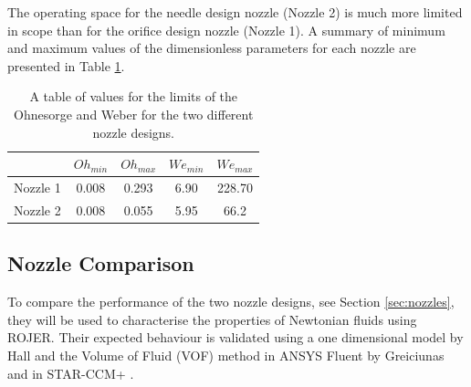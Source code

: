 \documentclass[11pt]{article}
\begin{document}
The operating space for the needle design nozzle (Nozzle 2) is much more limited in scope than for the orifice design nozzle (Nozzle 1). A summary of minimum and maximum values of the dimensionless parameters for each nozzle are presented in Table \ref{tbl:operability}. 
\begin{table}[h]
\centering
\begin{tabular}{c|c|c|c|c|}
\cline{2-5}
                               & $Oh_{min}$ & $Oh_{max}$ & $We_{min}$ & $We_{max}$ \\ \hline
\multicolumn{1}{|c|}{Nozzle 1} & 0.008      & 0.293      & 6.90       & 228.70     \\ \hline
\multicolumn{1}{|c|}{Nozzle 2} & 0.008      & 0.055      & 5.95       & 66.2       \\ \hline
\end{tabular}
\caption{A table of values for the limits of the Ohnesorge and Weber for the two different nozzle designs.}
\label{tbl:operability}
\end{table}

\subsection{Nozzle Comparison}
To compare the performance of the two nozzle designs, see Section \ref{sec:nozzles}, they will be used to characterise the properties of Newtonian fluids using ROJER. Their expected behaviour is validated using a one dimensional model by Hall \cite{hall2015report} and the Volume of Fluid (VOF) method in ANSYS Fluent by Greiciunas \cite{greiciunas2015report} and in STAR-CCM+ \cite{gorbatenko2015report}.
\end{document}
